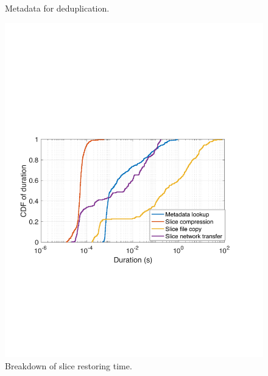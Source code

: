 \begin{figure}[t]
\begin{minipage}{0.38\linewidth}
				\caption{Metadata for deduplication.}
				\label{fig:sift-metadata}
			\end{minipage}
		\begin{minipage}{0.38\linewidth}
			\centering
			\includegraphics[width=1\textwidth]{graphs/restoring-breakdowns.pdf}
			\caption{Breakdown of slice restoring time.}
			\label{fig:slice-restoring-breakdown}
		\end{minipage}
\end{figure}



